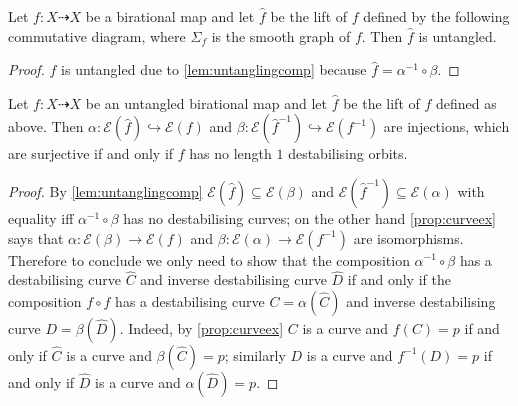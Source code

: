 \documentclass[11pt, final]{amsart}
\newcommand{\dashto}{\dashrightarrow}
\newcommand{\E}{\mathcal{E}}
\newcommand{\sgraph}{\Sigma}
\newcommand{\nice}{untangled}
\begin{document}
\begin{cor}\label{cor:graphnice}
  Let $f : X \dashto X$ be a birational map and let $\hat f$ be the lift of $f$ defined by the following commutative diagram, where $\sgraph_{\!f}$ is the smooth graph of $f$. Then $\hat f$ is \nice{}.
    \begin{center}
  \end{center}
\end{cor}

\begin{proof}
 $\hat f$ is \nice{} due to \autoref{lem:untanglingcomp} because $\hat f = \alpha^{-1} \circ \beta$.
 \end{proof}

\begin{cor}\label{cor:equivexceptionals}
  Let $f : X \dashto X$ be an \nice{} birational map and let $\hat f$ be the lift of $f$ defined as above. Then $\alpha : \E(\hat f) \hookrightarrow \E(f)$ and $\beta : \E(\hat f ^{-1}) \hookrightarrow \E(f ^{-1})$ are injections, which are surjective if and only if $f$ has no length $1$ destabilising orbits.
\end{cor}

\begin{proof}
 By \autoref{lem:untanglingcomp} $\E(\hat f) \subseteq \E(\beta)$ and $\E(\hat f^{-1}) \subseteq \E(\alpha)$ with equality iff $\alpha^{-1} \circ \beta$ has no destabilising curves; on the other hand \autoref{prop:curveex} says that $\alpha : \E(\beta) \to \E(f)$ and $\beta : \E(\alpha) \to \E(f^{-1})$ are isomorphisms. Therefore to conclude we only need to show that the composition $\alpha^{-1} \circ \beta$ has a destabilising curve $\hat C$ and inverse destabilising curve $\hat D$ if and only if the composition $f\circ f$ has a destabilising curve $C = \alpha(\hat C)$ and inverse destabilising curve $D = \beta(\hat D)$.
  Indeed, by \autoref{prop:curveex} $C$ is a curve and $f(C) = p$ if and only if $\hat C$ is a curve and $\beta(\hat C) = p$; similarly $D$ is a curve and $f^{-1}(D) = p$ if and only if $\hat D$ is a curve and $\alpha(\hat D) = p$.
\end{proof}

 
\end{document}
